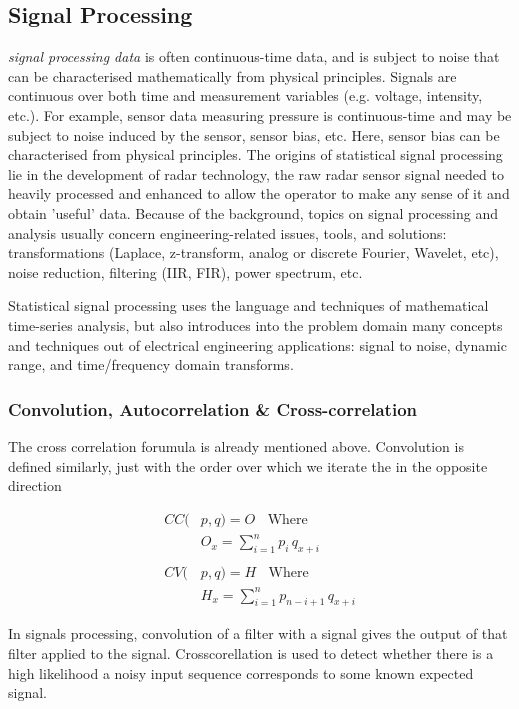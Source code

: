 \documentclass[9pt,conference]{IEEEtran}
\begin{document}
\subsection{Signal Processing}
\textit{signal processing data} is often continuous-time data, and is subject to noise that can be characterised mathematically from physical principles. Signals are continuous over both time and measurement variables (e.g. voltage, intensity, etc.). For example, sensor data measuring pressure is continuous-time and may be subject to noise induced by the sensor, sensor bias, etc. Here, sensor bias can be characterised from physical principles. The origins of statistical signal processing lie in the development of radar technology, the raw radar sensor signal needed to heavily processed and enhanced to allow the operator to make any sense of it and obtain 'useful' data. Because of the background, topics on signal processing and analysis usually concern engineering-related issues, tools, and solutions: transformations (Laplace, z-transform, analog or discrete Fourier, Wavelet, etc), noise reduction, filtering (IIR, FIR), power spectrum, etc.

Statistical signal processing uses the language and techniques of mathematical time-series analysis, but also introduces into the problem domain many concepts and techniques out of electrical engineering applications: signal to noise, dynamic range, and time/frequency domain transforms.

\subsubsection{Convolution, Autocorrelation \& Cross-correlation}
The cross correlation forumula is already mentioned above. Convolution is defined similarly, just with the order over which we iterate the  in the opposite direction

\begin{align*}
            CC(&p,q) = O \;\;\text{ Where}\\
            &O_x = \sum_{i=1}^{n}p_i\, q_{x+i} \\
            &\\
            CV(&p,q) = H \;\;\text{ Where}\\
            &H_x = \sum_{i=1}^{n}p_{n-i+1}\, q_{x+i}
\end{align*}

In signals processing, convolution of a filter with a signal gives the output of that filter applied to the signal. Crosscorellation is used to detect whether there is a high likelihood a noisy input sequence corresponds to some known expected signal.
\end{document}
